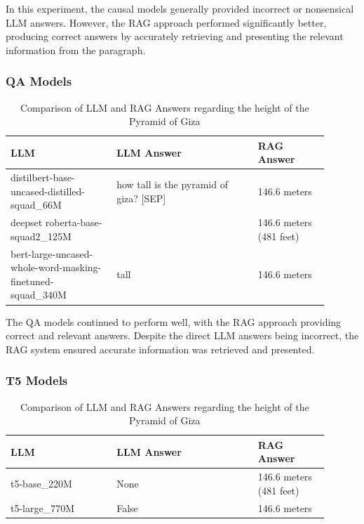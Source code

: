 \documentclass{wseas}
\begin{document}
In this experiment, the causal models generally provided incorrect or
nonsensical LLM answers. However, the RAG approach performed
significantly better, producing correct answers by accurately retrieving
and presenting the relevant information from the paragraph.

\subsubsection{QA Models}
\begin{table}[htbp]
\centering
\begin{tabular}{|p{0.3\linewidth}|p{0.4\linewidth}|p{0.2\linewidth}|}
\hline
\textbf{LLM} & \textbf{LLM Answer} & \textbf{RAG Answer} \\ \hline
distilbert-base-uncased-distilled-squad\_66M & how tall is the pyramid of giza? {[}SEP{]} & 146.6 meters \\ \hline
deepset roberta-base-squad2\_125M &  & 146.6 meters (481 feet) \\ \hline
bert-large-uncased-whole-word-masking-finetuned-squad\_340M & tall & 146.6 meters \\ \hline
\end{tabular}
\caption{Comparison of LLM and RAG Answers regarding the height of the Pyramid of Giza}
\end{table}

The QA models continued to perform well, with the RAG approach providing
correct and relevant answers. Despite the direct LLM answers being
incorrect, the RAG system ensured accurate information was retrieved and
presented.

\subsubsection{T5 Models}


\begin{table}[htbp]
\centering
\begin{tabular}{|p{0.3\linewidth}|p{0.4\linewidth}|p{0.2\linewidth}|}
\hline
\textbf{LLM} & \textbf{LLM Answer} & \textbf{RAG Answer} \\ \hline
t5-base\_220M & None & 146.6 meters (481 feet) \\ \hline
t5-large\_770M & False & 146.6 meters \\ \hline
\end{tabular}
\caption{Comparison of LLM and RAG Answers regarding the height of the Pyramid of Giza}
\end{table}
\end{document}
